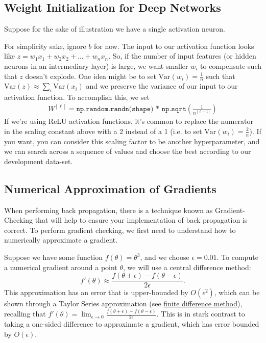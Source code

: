 \documentclass[12pt]{article}
\begin{document}
\subsection{Weight Initialization for Deep Networks} Suppose for the sake of illustration we have a single activation neuron.
\begin{figure}[h]
  \centering   
\end{figure}
For simplicity sake, ignore $b$ for now. The input to our activation function
looks like $z = w_1 x_1 + w_2 x_2 + \ldots + w_n x_n$. So, if the number of input features (or hidden neurons in an intermediary layer) is large, we want smaller $w_i$ to compensate such that $z$ doesn't explode. One idea might be to set $\textrm{Var}(w_i) = \frac{1}{n}$ such that $\textrm{Var}(z) \approx \sum_i \textrm{Var}(x_i)$ and we preserve the variance of our input to our activation function. To accomplish this, we set
\begin{align*}   W^{[\ell]} = \texttt{np.random.randn(shape) * np.sqrt} \left(\frac{1}{n^{[\ell-1]}}\right) \end{align*}
If we're using ReLU activation functions, it's common to replace the numerator in the scaling constant above with a 2 instead of a 1 (i.e. to set $\textrm{Var}(w_i) = \frac{2}{n}$). If you want, you can consider this scaling factor to be another hyperparameter, and we can search across a sequence of values and choose the best according to our development data-set.

\subsection{Numerical Approximation of Gradients}
When performing back propagation, there is a technique known as Gradient-Checking
that will help to ensure your implementation of back propagation is correct. To 
perform gradient checking, we first need to understand how to numerically approximate
a gradient.

Suppose we have some function $f(\theta) = \theta^3$, and we choose $\epsilon = 0.01$. To compute a numerical gradient around a point $\theta$, we will use a central difference method:
\[
f'(\theta) \approx \frac{f(\theta + \epsilon) - f(\theta - \epsilon)}{2 \epsilon}.
\]
This approximation has an error that is upper-bounded by $O(\epsilon^2)$, which can be shown through a Taylor Series approximation (see \href{https://en.wikipedia.org/wiki/Finite_difference_method#Accuracy_and_order}{finite difference method}), recalling that $f'(\theta) = \lim_{\epsilon \to 0} \frac{f(\theta + \epsilon) - f(\theta - \epsilon)}{2 \epsilon}$. This is in stark contrast to taking a one-sided difference to approximate a gradient, which has error bounded by $O(\epsilon)$.
\end{document}

